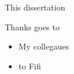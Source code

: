 This dissertation 

Thanks goes to
\begin{itemize}
\item My collegaues
\item to Fifi
\end{itemize}



%
